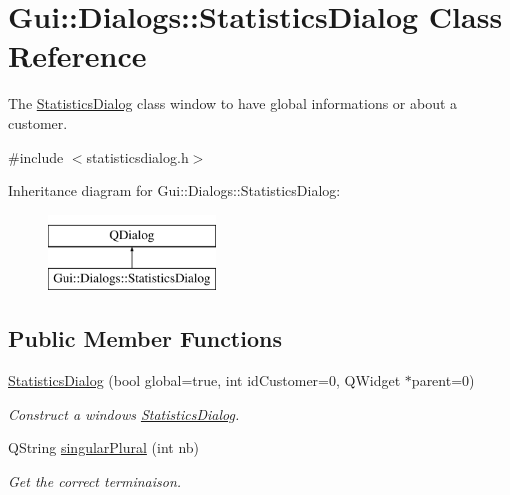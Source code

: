 \hypertarget{classGui_1_1Dialogs_1_1StatisticsDialog}{\section{Gui\-:\-:Dialogs\-:\-:Statistics\-Dialog Class Reference}
\label{classGui_1_1Dialogs_1_1StatisticsDialog}
}


The \hyperlink{classGui_1_1Dialogs_1_1StatisticsDialog}{Statistics\-Dialog} class window to have global informations or about a customer.  




{\ttfamily \#include $<$statisticsdialog.\-h$>$}

Inheritance diagram for Gui\-:\-:Dialogs\-:\-:Statistics\-Dialog\-:\begin{figure}[H]
\begin{center}
\leavevmode
\includegraphics[height=2.000000cm]{d1/ddc/classGui_1_1Dialogs_1_1StatisticsDialog}
\end{center}
\end{figure}
\subsection*{Public Member Functions}
\begin{DoxyCompactItemize}
\item 
\hyperlink{classGui_1_1Dialogs_1_1StatisticsDialog_a6fe5b8b662958e2740f7a5905168bca9}{Statistics\-Dialog} (bool global=true, int id\-Customer=0, Q\-Widget $\ast$parent=0)
\begin{DoxyCompactList}\small\item\em Construct a windows \hyperlink{classGui_1_1Dialogs_1_1StatisticsDialog}{Statistics\-Dialog}. \end{DoxyCompactList}\item 
Q\-String \hyperlink{classGui_1_1Dialogs_1_1StatisticsDialog_a8284c2ac0cc4c953d928ef9552a83096}{singular\-Plural} (int nb)
\begin{DoxyCompactList}\small\item\em Get the correct terminaison. \end{DoxyCompactList}\end{DoxyCompactItemize}


